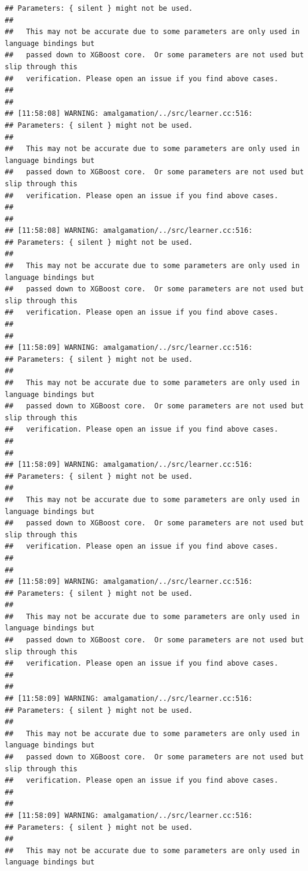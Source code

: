 \documentclass[AMS,STIX2COL]{WileyNJD-v2}\usepackage[]{graphicx}\usepackage[]{color}
\makeatletter
\newenvironment{kframe}{%
 \def\at@end@of@kframe{}%
 \ifinner\ifhmode%
  \def\at@end@of@kframe{\end{minipage}}%
  \begin{minipage}{\columnwidth}%
 \fi\fi%
 \def\FrameCommand##1{\hskip\@totalleftmargin \hskip-\fboxsep
 \colorbox{shadecolor}{##1}\hskip-\fboxsep
     \hskip-\linewidth \hskip-\@totalleftmargin \hskip\columnwidth}%
 \MakeFramed {\advance\hsize-\width
   \@totalleftmargin\z@ \linewidth\hsize
   \@setminipage}}%
 {\par\unskip\endMakeFramed%
 \at@end@of@kframe}
\newenvironment{knitrout}{}{} %
\makeatother
\begin{document}
\begin{knitrout}
\begin{kframe}
\begin{verbatim}
## Parameters: { silent } might not be used.
## 
##   This may not be accurate due to some parameters are only used in language bindings but
##   passed down to XGBoost core.  Or some parameters are not used but slip through this
##   verification. Please open an issue if you find above cases.
## 
## 
## [11:58:08] WARNING: amalgamation/../src/learner.cc:516: 
## Parameters: { silent } might not be used.
## 
##   This may not be accurate due to some parameters are only used in language bindings but
##   passed down to XGBoost core.  Or some parameters are not used but slip through this
##   verification. Please open an issue if you find above cases.
## 
## 
## [11:58:08] WARNING: amalgamation/../src/learner.cc:516: 
## Parameters: { silent } might not be used.
## 
##   This may not be accurate due to some parameters are only used in language bindings but
##   passed down to XGBoost core.  Or some parameters are not used but slip through this
##   verification. Please open an issue if you find above cases.
## 
## 
## [11:58:09] WARNING: amalgamation/../src/learner.cc:516: 
## Parameters: { silent } might not be used.
## 
##   This may not be accurate due to some parameters are only used in language bindings but
##   passed down to XGBoost core.  Or some parameters are not used but slip through this
##   verification. Please open an issue if you find above cases.
## 
## 
## [11:58:09] WARNING: amalgamation/../src/learner.cc:516: 
## Parameters: { silent } might not be used.
## 
##   This may not be accurate due to some parameters are only used in language bindings but
##   passed down to XGBoost core.  Or some parameters are not used but slip through this
##   verification. Please open an issue if you find above cases.
## 
## 
## [11:58:09] WARNING: amalgamation/../src/learner.cc:516: 
## Parameters: { silent } might not be used.
## 
##   This may not be accurate due to some parameters are only used in language bindings but
##   passed down to XGBoost core.  Or some parameters are not used but slip through this
##   verification. Please open an issue if you find above cases.
## 
## 
## [11:58:09] WARNING: amalgamation/../src/learner.cc:516: 
## Parameters: { silent } might not be used.
## 
##   This may not be accurate due to some parameters are only used in language bindings but
##   passed down to XGBoost core.  Or some parameters are not used but slip through this
##   verification. Please open an issue if you find above cases.
## 
## 
## [11:58:09] WARNING: amalgamation/../src/learner.cc:516: 
## Parameters: { silent } might not be used.
## 
##   This may not be accurate due to some parameters are only used in language bindings but

\end{verbatim}
\end{kframe}
\end{knitrout}
\end{document}
